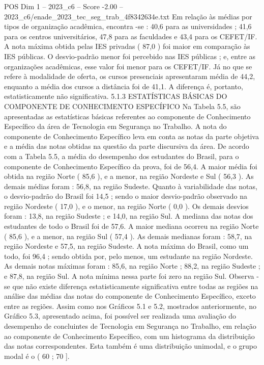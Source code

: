 \begin{textsample}{POS Dim 1 – 2023\_c6 – Score -2.00 – 2023\_c6/enade\_2023\_tec\_seg\_trab\_4f8342634e.txt}
Em relação às médias por tipos de organização acadêmica, encontra -se : 40,6 para as universidades ; 41,6 para os centros universitários, 47,8 para as faculdades e 43,4 para os CEFET/IF.
A nota máxima obtida pelas IES privadas ( 87,0 ) foi maior em comparação às IES públicas.
O desvio-padrão menor foi percebido nas IES públicas ; e, entre as organizações acadêmicas, esse valor foi menor para os CEFET/IF.
Já no que se refere à modalidade de oferta, os cursos presenciais apresentaram média de 44,2, enquanto a média dos cursos a distância foi de 41,1.
A diferença é, portanto, estatisticamente não significativa. 5.1.3 ESTATÍSTICAS BÁSICAS DO COMPONENTE DE CONHECIMENTO ESPECÍFICO Na Tabela 5.5, são apresentadas as estatísticas básicas referentes ao componente de Conhecimento Específico da área de Tecnologia em Segurança no Trabalho.
A nota do componente de Conhecimento Específico leva em conta as notas da parte objetiva e a média das notas obtidas na questão da parte discursiva da área.
De acordo com a Tabela 5.5, a média do desempenho dos estudantes do Brasil, para o componente de Conhecimento Específico da prova, foi de 56,4.
A maior média foi obtida na região Norte ( 85,6 ), e a menor, na região Nordeste e Sul ( 56,3 ).
As demais médias foram : 56,8, na região Sudeste.
Quanto à variabilidade das notas, o desvio-padrão do Brasil foi 14,5 ; sendo o maior desvio-padrão observado na região Nordeste ( 17,0 ), e o menor, na região Norte ( 0,0 ).
Os demais desvios foram : 13,8, na região Sudeste ; e 14,0, na região Sul.
A mediana das notas dos estudantes de todo o Brasil foi de 57,6.
A maior mediana ocorreu na região Norte ( 85,6 ), e a menor, na região Sul ( 57,4 ).
As demais medianas foram : 58,7, na região Nordeste e 57,5, na região Sudeste.
A nota máxima do Brasil, como um todo, foi 96,4 ; sendo obtida por, pelo menos, um estudante na região Nordeste.
As demais notas máximas foram : 85,6, na região Norte ; 88,2, na região Sudeste ; e 87,8, na região Sul.
A nota mínima nessa parte foi zero na região Sul.
Observa -se que não existe diferença estatisticamente significativa entre todas as regiões na análise das médias das notas do componente de Conhecimento Específico, exceto entre as regiões.
Assim como nos Gráficos 5.1 e 5.2, mostrados anteriormente, no Gráfico 5.3, apresentado acima, foi possível ser realizada uma avaliação do desempenho de concluintes de Tecnologia em Segurança no Trabalho, em relação ao componente de Conhecimento Específico, com um histograma da distribuição das notas correspondentes.
Esta também é uma distribuição unimodal, e o grupo modal é o ( 60 ; 70 ].

\end{textsample}
